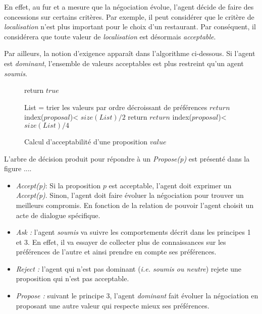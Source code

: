 			En effet, au fur et a mesure que la négociation évolue, l'agent décide de faire des concessions sur certains critères. Par exemple, il peut considérer que le critère de \emph{localisation} n'est plus important pour le choix d'un restaurant. Par conséquent, il considérera que toute valeur de \emph{localisation} est désormais \emph{acceptable}.
			
			Par ailleurs, la notion d'exigence apparaît dans l'algorithme ci-dessous. Si l'agent est \emph{dominant}, l'ensemble de valeurs acceptables est plus restreint qu'un agent \emph{soumis}.
			
			\begin{figure}[]
				\begin{algorithmic}[1]\small
					\State return $true$
					\EndIf
					
					\State List = trier les valeurs par ordre décroissant de préférences
					\State $return$ index($proposal$)< $size(List)/2$
					\EndIf
					\State return $return$ index($proposal$)< $size(List)/4$
					\EndIf
					\EndFunction
				\end{algorithmic}
				\vskip 8pt
				\label{pseudo}
				\caption{Calcul d'acceptabilité d'une proposition $value$}
			\end{figure} 
			
			
			L'arbre de décision produit pour répondre à un \emph{Propose(p)} est présenté dans la figure .... 
			\begin{itemize}
			
				\item  \emph{Accept(p)}: Si la proposition $p$ est acceptable, l'agent doit exprimer un \emph{Accept(p)}. Sinon, l'agent doit faire évoluer la négociation pour trouver un meilleurs compromis. En fonction de la relation de pouvoir l'agent choisit un acte de dialogue spécifique.
				\item \emph{Ask :} l'agent \emph{soumis} va suivre les comportements décrit dans les principes 1 et 3. En effet, il va essayer de collecter plus de connaissances sur les préférences de l'autre et ainsi prendre en compte ses préférences. 
				\item \emph{Reject :} l'agent qui n'est pas dominant (\emph{i.e. soumis ou neutre}) rejete une proposition qui n'est pas acceptable.
				\item \emph{Propose :} suivant le principe 3, l'agent \emph{dominant} fait évoluer la négociation en proposant une autre valeur qui respecte mieux ses préférences. 
			\end{itemize}
	
